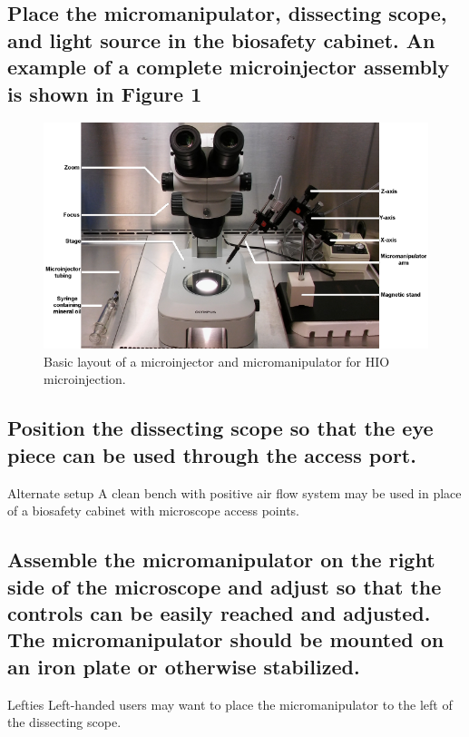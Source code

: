 \documentclass[11pt]{article}
\begin{document}
\subsection{{\sffamily } Place the micromanipulator, dissecting scope, and light source in the biosafety cabinet. An example of a complete microinjector assembly is shown in \textbf{Figure 1}}
\label{sec:orgheadline2}
\begin{figure}
\centering
\includegraphics[width=0.9\linewidth]{./img/figure1.pdf}
\caption{Basic layout of a microinjector and micromanipulator for HIO microinjection.}
\end{figure}
\subsection{{\sffamily } Position the dissecting scope so that the eye piece can be used through the access port.}
\label{sec:orgheadline3}
\begin{bclogo}[logo=\bcinfo, couleurBarre=Black, noborder=true, couleur=gray!10]{     Alternate setup}
A clean bench with positive air flow system may be used in place of a biosafety cabinet with microscope access points.\\
\end{bclogo}
\subsection{{\sffamily } Assemble the micromanipulator on the right side of the microscope and adjust so that the controls can be easily reached and adjusted. The micromanipulator should be mounted on an iron plate or otherwise stabilized.}
\label{sec:orgheadline4}
\begin{bclogo}[logo=\bcinfo, couleurBarre=Black, noborder=true, couleur=gray!10]{     Lefties}
Left-handed users may want to place the micromanipulator to the left of the dissecting scope.\\
\end{bclogo}
\end{document}
